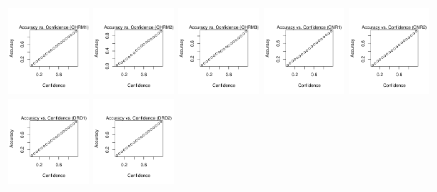 \documentclass[10pt,article]{memoir}
\begin{document}
\begin{figure}[h!]
\includegraphics[width=0.19\textwidth]{figures/calibration_plots/chrm1_calib.pdf}
\includegraphics[width=0.19\textwidth]{figures/calibration_plots/chrm2_calib.pdf}
\includegraphics[width=0.19\textwidth]{figures/calibration_plots/chrm3_calib.pdf}
\includegraphics[width=0.19\textwidth]{figures/calibration_plots/cnr1_calib.pdf}
\includegraphics[width=0.19\textwidth]{figures/calibration_plots/cnr2_calib.pdf}
\includegraphics[width=0.19\textwidth]{figures/calibration_plots/drd1_calib.pdf}
\includegraphics[width=0.19\textwidth]{figures/calibration_plots/drd2_calib.pdf}

\end{figure}
\end{document}
